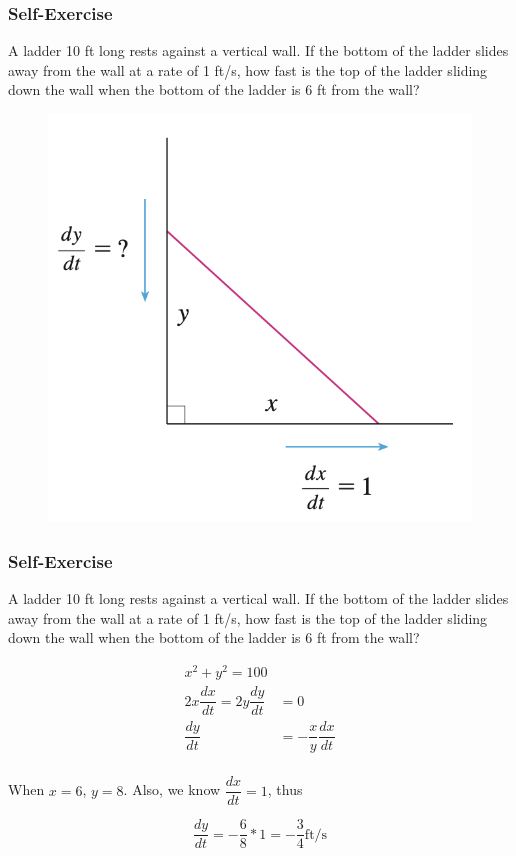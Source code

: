 \documentclass[t]{beamer}
\theoremstyle{plain}
\theoremstyle{definition}
\begin{document}
\begin{frame}
\frametitle{Self-Exercise}

\footnotesize

A ladder 10 ft long rests against a vertical wall.   If the bottom of the ladder slides away from the wall at a rate of 1 ft/s, how fast is the top of the ladder sliding down the wall when the bottom of the ladder is 6 ft from the wall?

\begin{figure}[t]
\begin{center}
\includegraphics[scale=0.45]{fig/ladder}
\end{center}
\end{figure}

\end{frame}

\begin{frame}
\frametitle{Self-Exercise}

\footnotesize

A ladder 10 ft long rests against a vertical wall.   If the bottom of the ladder slides away from the wall at a rate of 1 ft/s, how fast is the top of the ladder sliding down the wall when the bottom of the ladder is 6 ft from the wall?

\begin{align*}
    x^2 + y^2 = 100\\
    2x\dfrac{dx}{dt} = 2y\dfrac{dy}{dt} &= 0\\
    \dfrac{dy}{dt} &= -\dfrac{x}{y} \dfrac{dx}{dt}\\
\end{align*}

When $x=6$,   $y=8$.  Also, we know $\dfrac{dx}{dt} = 1$, thus

$$\dfrac{dy}{dt} = -\dfrac{6}{8} * 1 = -\dfrac{3}{4} \text{ft/s} $$

\end{frame}
\end{document}
